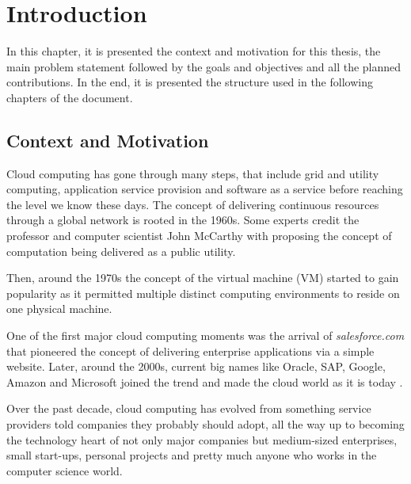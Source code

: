 \newcommand{\novathesis}{\emph{novathesis}}
\newcommand{\novathesisclass}{\texttt{novathesis.cls}}


\chapter{Introduction}
\label{cha:introduction}

In this chapter, it is presented the context and motivation for this thesis, the main problem statement followed by the goals and objectives and all the planned contributions. In the end, it is presented the structure used in the following chapters of the document.

\section{Context and Motivation} %
\label{sec:context_and_motivation}

Cloud computing has gone through many steps, that include grid and utility computing, application service provision and software as a service before reaching the level we know these days. The concept of delivering continuous resources through a global network is rooted in the 1960s. Some experts credit the professor and computer scientist John McCarthy \cite{john_mcCarthy:1} with proposing the concept of computation being delivered as a public utility.

Then, around the 1970s the concept of the virtual machine (\gls{VM}) started to gain popularity as it permitted multiple distinct computing environments to reside on one physical machine.

One of the first major cloud computing moments was the arrival of \textit{salesforce.com} that pioneered the concept of delivering enterprise applications via a simple website. Later, around the 2000s, current big names like Oracle, SAP, Google, Amazon and Microsoft joined the trend and made the cloud world as it is today \cite{cloud_history:1, cloud_history:2}.

Over the past decade, cloud computing has evolved from something service providers told companies they probably should adopt, all the way up to becoming the technology heart of not only major companies but medium-sized enterprises, small start-ups, personal projects and pretty much anyone who works in the computer science world. 

